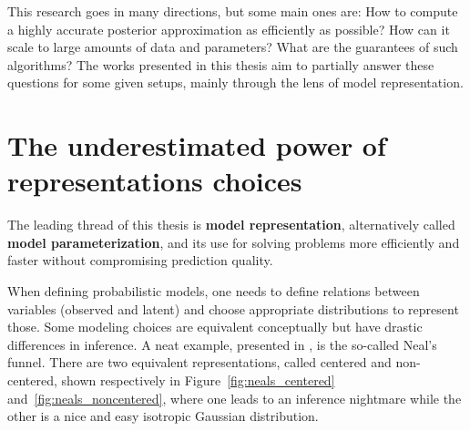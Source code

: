 This research goes in many directions, but some main ones are: How to compute a highly accurate posterior approximation as efficiently as possible? How can it scale to large amounts of data and parameters? What are the guarantees of such algorithms?
The works presented in this thesis aim to partially answer these questions for some given setups, mainly through the lens of model representation.

\section{The underestimated power of representations choices}

The leading thread of this thesis is \textbf{model representation}, alternatively called \textbf{model parameterization}, and its use for solving problems more efficiently and faster without compromising prediction quality.

When defining probabilistic models, one needs to define relations between variables (observed and latent) and choose appropriate distributions to represent those.
Some modeling choices are equivalent conceptually but have drastic differences in inference.
A neat example, presented in \citet{gorinovaAutomaticReparameterisationProbabilistic2020}, is the so-called Neal's funnel.
There are two equivalent representations, called centered and non-centered, shown respectively in Figure~\ref{fig:neals_centered} and~\ref{fig:neals_noncentered}, where one leads to an inference nightmare while the other is a nice and easy isotropic Gaussian distribution.

